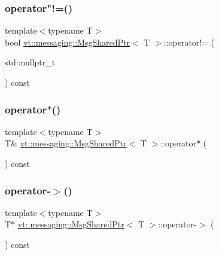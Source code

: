 \subsubsection{\texorpdfstring{operator"!=()}{operator!=()}\hspace{0.1cm}{\footnotesize\ttfamily [2/2]}}
{\footnotesize\ttfamily template$<$typename T$>$ \\
bool \hyperlink{structvt_1_1messaging_1_1_msg_shared_ptr}{vt\+::messaging\+::\+Msg\+Shared\+Ptr}$<$ T $>$\+::operator!= (\begin{DoxyParamCaption}\item[{std\+::nullptr\+\_\+t}]{ }\end{DoxyParamCaption}) const\hspace{0.3cm}{\ttfamily [inline]}}

\mbox{\label{structvt_1_1messaging_1_1_msg_shared_ptr_a609cd3703233ec7a0e26db0ff457b8f7}} 
\subsubsection{\texorpdfstring{operator$\ast$()}{operator*()}}
{\footnotesize\ttfamily template$<$typename T$>$ \\
T\& \hyperlink{structvt_1_1messaging_1_1_msg_shared_ptr}{vt\+::messaging\+::\+Msg\+Shared\+Ptr}$<$ T $>$\+::operator$\ast$ (\begin{DoxyParamCaption}{ }\end{DoxyParamCaption}) const\hspace{0.3cm}{\ttfamily [inline]}}

\mbox{\label{structvt_1_1messaging_1_1_msg_shared_ptr_a4140dc4ea157de37d258c8f8821179c8}} 
\subsubsection{\texorpdfstring{operator-\/$>$()}{operator->()}}
{\footnotesize\ttfamily template$<$typename T$>$ \\
T$\ast$ \hyperlink{structvt_1_1messaging_1_1_msg_shared_ptr}{vt\+::messaging\+::\+Msg\+Shared\+Ptr}$<$ T $>$\+::operator-\/$>$ (\begin{DoxyParamCaption}{ }\end{DoxyParamCaption}) const\hspace{0.3cm}{\ttfamily [inline]}}

